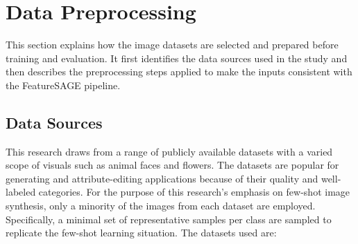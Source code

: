 \section{Data Preprocessing}

This section explains how the image datasets are selected and prepared before training and evaluation. It first identifies the data sources used in the study and then describes the preprocessing steps applied to make the inputs consistent with the FeatureSAGE pipeline.

\subsection{Data Sources}

This research draws from a range of publicly available datasets with a varied scope of visuals such as animal faces and flowers. The datasets are popular for generating and attribute-editing applications because of their quality and well-labeled categories. For the purpose of this research's emphasis on few-shot image synthesis, only a minority of the images from each dataset are employed. Specifically, a minimal set of representative samples per class are sampled to replicate the few-shot learning situation. The datasets used are:

